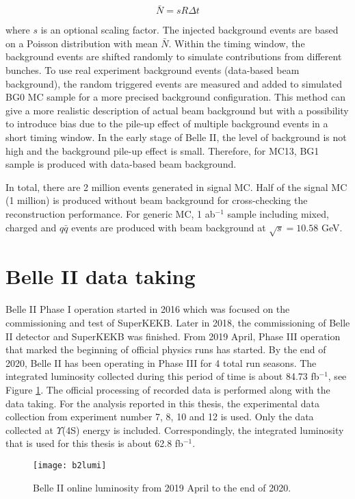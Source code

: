 \begin{equation}\label{bkgn}
	\bar{N} = sR\Delta t
\end{equation}

where $s$ is an optional scaling factor. The injected background events are based on a Poisson distribution with mean $\bar{N}$. Within the timing window, the background events are shifted randomly to simulate contributions from different bunches. To use real experiment background events (data-based beam background), the random triggered events are measured and added to
simulated BG0 MC sample for a more precised background configuration. This method can give a more realistic description of actual beam background but with a possibility to introduce bias due to the pile-up effect of multiple background events in a short timing window. In the early stage of Belle II, the level of background is not high and the background pile-up effect is small. Therefore, for MC13, BG1 sample is produced with data-based beam background.

In total, there are 2 million events generated in signal MC. Half of the signal MC (1 million) is produced without beam background for cross-checking the reconstruction performance. For generic MC, 1 ab$^{-1}$ sample including mixed, charged and $q\bar{q}$ events are produced with beam background at  $\sqrt{s} = 10.58 $ GeV.

\section{Belle II data taking}
Belle II Phase I operation started in 2016 which was focused on the commissioning and test of SuperKEKB. Later in 2018, the commissioning of Belle II detector and SuperKEKB was finished. From 2019 April, Phase III operation that marked the beginning of official physics runs has started. By the end of 2020, Belle II has been operating in Phase III for 4 total run seasons. The integrated luminosity collected during this period of time is about 84.73 fb$^{-1}$, see Figure \ref{fig:b2lumi}. The official processing of recorded data is performed along with the data taking. For the analysis reported in this thesis, the experimental data collection from experiment number 7, 8, 10 and 12 is used.  Only the data collected at  $\Upsilon$(4S) energy is included. Correspondingly, the integrated luminosity that is used for this thesis is about 62.8 fb$^{-1}$\cite{b2onlinelumi}. 

\begin{figure}
	\centering
	\texttt{[image: b2lumi]}
	\caption{Belle II online luminosity from 2019 April to the end of 2020\cite{b2onlinelumi}.}
	\label{fig:b2lumi} 
\end{figure}
